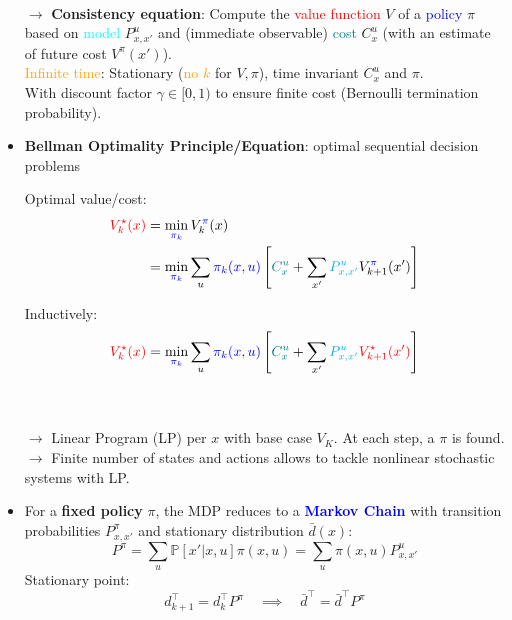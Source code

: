 \begin{itemize}
\begin{align*}
    \end{align*}
    $\rightarrow$ \textbf{Consistency equation}: Compute the \textcolor{red}{value function} $V$ of a \textcolor{blue}{policy} $\pi$ based on \textcolor{cyan}{model} $P^u_{x,x'}$ and (immediate observable) \textcolor{teal}{cost} $C_x^u$ (with an estimate of future cost $V^{\pi}(x')$). \\
    \textcolor{orange}{Infinite time}: Stationary (\textcolor{orange}{no $k$} for $V, \pi$), time invariant $C^u_x$ and $\pi$. \\
    \phantom{\textcolor{orange}{Infinite time}:} With discount factor $\gamma \in [0,1)$ to ensure finite cost (Bernoulli termination probability).
    \item \textbf{Bellman Optimality Principle/Equation}: optimal sequential decision problems \\
    \begin{minipage}[t]{0.48\textwidth}
        Optimal value/cost:
        \begin{align*}
            \textcolor{red}{V^\star_k(x)} &= \min_{\textcolor{blue}{\pi_k}} V^{\textcolor{blue}{\pi}}_{k}(x) \\
            &= \min_{\textcolor{blue}{\pi_k}} \sum_{u} \textcolor{blue}{\pi_k(x, u)} \left[ {\color{teal}C^u_x} + \sum_{x'} {\color{cyan}P^u_{x,x'}} V^{\textcolor{blue}{\pi}}_{k+1}(x') \right]
        \end{align*}
    \end{minipage}
    \begin{minipage}[t]{0.48\textwidth}
        Inductively:
        \[
        \textcolor{red}{V^\star_k(x)} = \min_{\textcolor{blue}{\pi_k}} \sum_{u} \textcolor{blue}{\pi_k(x, u)} \left[ {\color{teal}C^u_x} + \sum_{x'} {\color{cyan}P^u_{x,x'}} \textcolor{red}{V^\star_{k+1}(x')} \right]
        \]
    \end{minipage}\\ \\
    $\rightarrow$ Linear Program (LP) per $x$ with base case $V_K$. At each step, a $\pi$ is found.\\
    $\rightarrow$ Finite number of states and actions allows to tackle nonlinear stochastic systems with LP.
    \item For a \textbf{fixed policy} $\pi$, the MDP reduces to a \textcolor{blue}{\textbf{Markov Chain}} with transition probabilities $P^{\pi}_{x,x'}$ and stationary distribution $\bar{d}(x)$:
    \begin{equation*}
        P^{\pi} = \sum_u \mathbb{P}[x' | x, u]\pi(x, u) = \sum_u \pi(x, u) P^{u}_{x,x'}
    \end{equation*}
    Stationary point:
    \begin{equation*}
        d_{k+1}^{\top} = d_k^{\top} P^{\pi} \quad \implies \quad \boxed{\bar{d}^{\top} = \bar{d}^{\top} P^{\pi}}
    \end{equation*}
\end{itemize}

